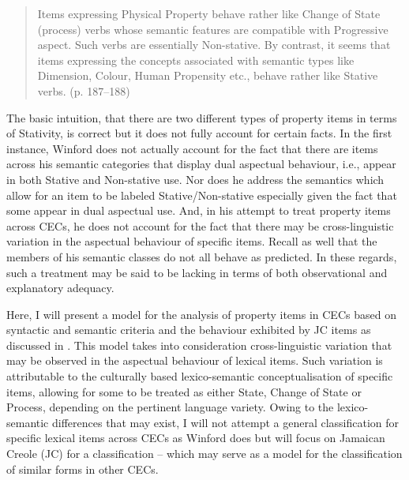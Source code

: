 \begin{quote}Items expressing Physical Property behave rather like Change of State (process) verbs whose semantic features are compatible with Progressive aspect. Such verbs are essentially Non-stative. By contrast, it seems that items expressing the concepts associated with semantic types like Dimension, Colour, Human Propensity etc., behave rather like Stative verbs. (p. 187--188)\end{quote}

The basic intuition, that there are two different types of property items in terms of Stativity, is correct but it does not fully account for certain facts. In the first instance, Winford does not actually account for the fact that there are items across his semantic categories that display dual aspectual behaviour, i.e., appear in both Stative and Non-stative use. Nor does he address the semantics which allow for an item to be labeled Stative\slash Non-stative especially given the fact that some appear in dual aspectual use. And, in his attempt to treat property items across CECs, he does not account for the fact that there may be cross-linguistic variation in the aspectual behaviour of specific items. Recall as well that the members of his semantic classes do not all behave as predicted. In these regards, such a treatment may be said to be lacking in terms of both observational and explanatory adequacy.

Here, I will present a model for the analysis of property items in CECs based on syntactic and semantic criteria and the behaviour exhibited by JC items as discussed in . This model takes into consideration cross-linguistic variation that may be observed in the aspectual behaviour of lexical items. Such variation is attributable to the culturally based lexico-semantic conceptualisation of specific items, allowing for some to be treated as either State, Change of State or Process, depending on the pertinent language variety. Owing to the lexico-semantic differences that may exist, I will not attempt a general classification for specific lexical items across CECs as Winford does but will focus on Jamaican Creole (JC) for a classification -- which may serve as a model for the classification of similar forms in other CECs. 



